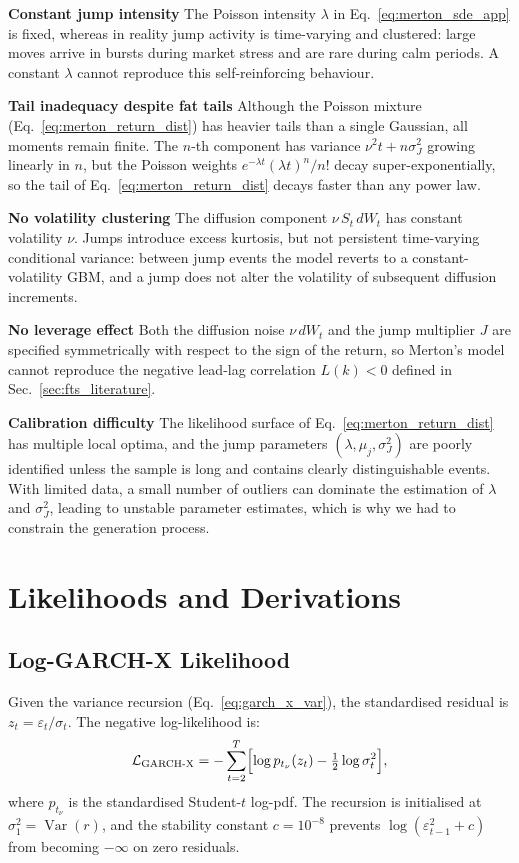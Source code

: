 \textbf{Constant jump intensity} \quad The Poisson intensity $\lambda$ in Eq.\ \ref{eq:merton_sde_app} is fixed, whereas in reality jump activity is time-varying and clustered: large moves arrive in bursts during market stress and are rare during calm periods. A constant $\lambda$ cannot reproduce this self-reinforcing behaviour.

\textbf{Tail inadequacy despite fat tails} \quad Although the Poisson mixture (Eq.\ \ref{eq:merton_return_dist}) has heavier tails than a single Gaussian, all moments remain finite. The $n$-th component has variance $\nu^2 t + n\sigma_J^2$ growing linearly in $n$, but the Poisson weights $e^{-\lambda t}(\lambda t)^n/n!$ decay super-exponentially, so the tail of Eq.\ \ref{eq:merton_return_dist} decays faster than any power law.

\textbf{No volatility clustering} \quad The diffusion component $\nu\, S_t\, dW_t$ has constant volatility $\nu$. Jumps introduce excess kurtosis, but not persistent time-varying conditional variance: between jump events the model reverts to a constant-volatility GBM, and a jump does not alter the volatility of subsequent diffusion increments.

\textbf{No leverage effect} \quad Both the diffusion noise $\nu\, dW_t$ and the jump multiplier $J$ are specified symmetrically with respect to the sign of the return, so Merton's model cannot reproduce the negative lead-lag correlation $L(k) < 0$ defined in Sec.\ \ref{sec:fts_literature}.

\textbf{Calibration difficulty} \quad The likelihood surface of Eq.\ \ref{eq:merton_return_dist} has multiple local optima, and the jump parameters $(\lambda, \mu_j, \sigma_J^2)$ are poorly identified unless the sample is long and contains clearly distinguishable events. With limited data, a small number of outliers can dominate the estimation of $\lambda$ and $\sigma_J^2$, leading to unstable parameter estimates, which is why we had to constrain the generation process.

\section{Likelihoods and Derivations}
\label{app:baselines}

\subsection{Log-GARCH-X Likelihood}

Given the variance recursion (Eq.\ \ref{eq:garch_x_var}), the standardised residual
is $z_t = \varepsilon_t / \sigma_t$. The negative log-likelihood is:
\begin{equation}
    \label{eq:garchx_nll_app}
    \mathcal{L}_{\text{GARCH-X}} = -\sum_{t=2}^T
        \Bigl[\log p_{t_\nu}(z_t) - \tfrac{1}{2}\log\sigma_t^2\Bigr],
\end{equation}
where $p_{t_\nu}$ is the standardised Student-$t$ log-pdf. The
recursion is initialised at $\sigma_1^2 = \operatorname{Var}(r)$, and the
stability constant $c = 10^{-8}$ prevents $\log(\varepsilon_{t-1}^2 + c)$
from becoming $-\infty$ on zero residuals.

